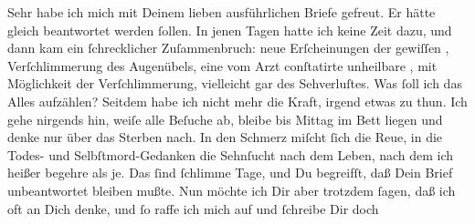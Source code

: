 \pstart
           Sehr habe ich mich mit Deinem lieben ausführlichen Briefe gefreut. Er hätte gleich
               beantwortet werden{ }ſollen. In jenen Tagen hatte ich keine Zeit dazu, und dann kam ein{ }ſchrecklicher  Zuſammenbruch: neue Erſcheinungen der gewiſſen \label{K_L02792-2v}\label{K_L02792-2}, Verſchlimmerung des Augenübels, eine vom Arzt
               conſtatirte unheilbare \label{K_L02792-3v}\label{K_L02792-3}, {\pb}mit Möglichkeit der Verſchlimmerung, vielleicht gar
               des Sehverluſtes. Was{ }ſoll ich das Alles aufzählen? Seitdem habe ich nicht mehr die
               Kraft, irgend etwas zu thun. Ich gehe nirgends hin, weiſe alle Beſuche ab, bleibe bis
                  Mittag im Bett liegen und denke nur über das Sterben nach. In den
               Schmerz miſcht{ }ſich die Reue, in die Todes- und Selbſtmord-Gedanken die Sehnſucht
               nach dem Leben, nach dem ich heißer begehre als je. Das{ }ſind{ }ſchlimme Tage, und Du
               begreifſt, daß  Dein Brief
               unbeantwortet bleiben mußte. Nun möchte ich Dir aber trotzdem{ }ſagen, daß ich oft an
               Dich denke, und{ }ſo raffe ich mich auf und{ }ſchreibe Dir doch{\dotssix}\pend
           
